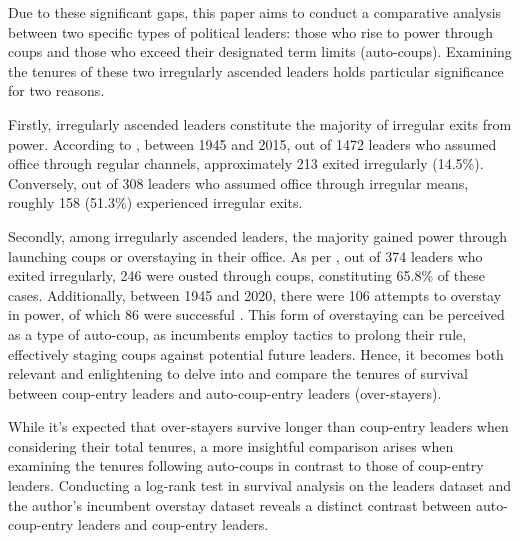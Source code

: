 \documentclass[
  12pt,
  a4paper,
  12pt]{article}
\begin{document}
Due to these significant gaps, this paper aims to conduct a comparative
analysis between two specific types of political leaders: those who rise
to power through coups and those who exceed their designated term limits
(auto-coups). Examining the tenures of these two irregularly ascended
leaders holds particular significance for two reasons.

Firstly, irregularly ascended leaders constitute the majority of
irregular exits from power. According to \citet{goemans2009}, between
1945 and 2015, out of 1472 leaders who assumed office through regular
channels, approximately 213 exited irregularly (14.5\%). Conversely, out
of 308 leaders who assumed office through irregular means, roughly 158
(51.3\%) experienced irregular exits.

Secondly, among irregularly ascended leaders, the majority gained power
through launching coups or overstaying in their office. As per
\citep{goemans2009}, out of 374 leaders who exited irregularly, 246 were
ousted through coups, constituting 65.8\% of these cases. Additionally,
between 1945 and 2020, there were 106 attempts to overstay in power, of
which 86 were successful \citep{zhu2024}. This form of overstaying can
be perceived as a type of auto-coup, as incumbents employ tactics to
prolong their rule, effectively staging coups against potential future
leaders. Hence, it becomes both relevant and enlightening to delve into
and compare the tenures of survival between coup-entry leaders and
auto-coup-entry leaders (over-stayers).

While it's expected that over-stayers survive longer than coup-entry
leaders when considering their total tenures, a more insightful
comparison arises when examining the tenures following auto-coups in
contrast to those of coup-entry leaders. Conducting a log-rank test in
survival analysis on the leaders dataset \citep{goemans2009} and the
author's incumbent overstay dataset \citep{zhu2024} reveals a distinct
contrast between auto-coup-entry leaders and coup-entry leaders.
\end{document}
